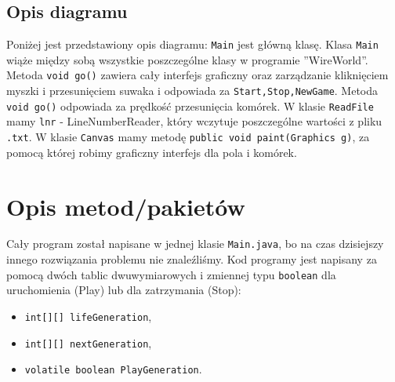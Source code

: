 \documentclass[a4paper, 12pt]{article}
\begin{document}
			\subsection{Opis diagramu} 
			\hspace*{1cm} Poniżej jest przedstawiony opis diagramu:\newline
			\hspace*{1cm} \texttt{Main} jest główną klasę. Klasa \texttt{Main} wiąże między sobą wszystkie poszczególne klasy w programie ''WireWorld''. \newline
			\hspace*{1cm} Metoda \texttt{void go()} zawiera cały interfejs graficzny oraz zarządzanie kliknięciem myszki i przesunięciem suwaka i odpowiada za \texttt{Start,Stop,NewGame}. Metoda \texttt{void go()} odpowiada za prędkość przesunięcia komórek. \newline
			\hspace*{1cm}W klasie \texttt{ReadFile} mamy \texttt{lnr} - LineNumberReader, który wczytuje poszczególne wartości z pliku \texttt{.txt}. \newline
			\hspace*{1cm}W klasie \texttt{Canvas} mamy metodę \texttt{public void paint(Graphics g)}, za pomocą której robimy graficzny interfejs dla pola i komórek.
\newpage
	\section{Opis metod/pakietów}
			\hspace*{1cm} Cały program został napisane w jednej klasie \texttt{Main.java}, bo na czas dzisiejszy innego rozwiązania problemu nie znaleźliśmy. \newline
			\hspace*{1cm} Kod programy jest napisany za pomocą dwóch tablic dwuwymiarowych i zmiennej typu \texttt{boolean} dla uruchomienia (Play) lub dla zatrzymania (Stop):
		\begin{itemize}
			\item \texttt{int[][] lifeGeneration},
			\item \texttt{int[][] nextGeneration},
			\item \texttt{volatile boolean PlayGeneration}.
		\end{itemize}
\end{document}

